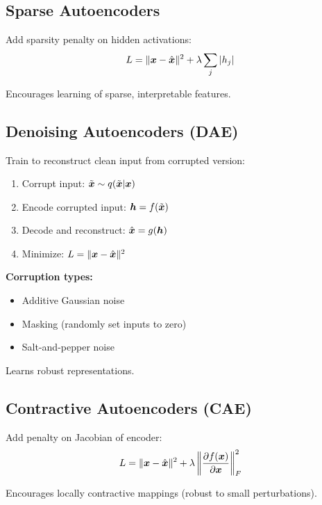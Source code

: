\subsection{Sparse Autoencoders}

Add sparsity penalty on hidden activations:
\begin{equation}
L = \|\boldsymbol{x} - \hat{\boldsymbol{x}}\|^2 + \lambda \sum_j |h_j|
\end{equation}

Encourages learning of sparse, interpretable features.

\subsection{Denoising Autoencoders (DAE)}

Train to reconstruct clean input from corrupted version:
\begin{enumerate}
    \item Corrupt input: $\tilde{\boldsymbol{x}} \sim q(\tilde{\boldsymbol{x}}|\boldsymbol{x})$
    \item Encode corrupted input: $\boldsymbol{h} = f(\tilde{\boldsymbol{x}})$
    \item Decode and reconstruct: $\hat{\boldsymbol{x}} = g(\boldsymbol{h})$
    \item Minimize: $L = \|\boldsymbol{x} - \hat{\boldsymbol{x}}\|^2$
\end{enumerate}

\textbf{Corruption types:}
\begin{itemize}
    \item Additive Gaussian noise
    \item Masking (randomly set inputs to zero)
    \item Salt-and-pepper noise
\end{itemize}

Learns robust representations.

\subsection{Contractive Autoencoders (CAE)}

Add penalty on Jacobian of encoder:
\begin{equation}
L = \|\boldsymbol{x} - \hat{\boldsymbol{x}}\|^2 + \lambda \left\|\frac{\partial f(\boldsymbol{x})}{\partial \boldsymbol{x}}\right\|_F^2
\end{equation}

Encourages locally contractive mappings (robust to small perturbations).

